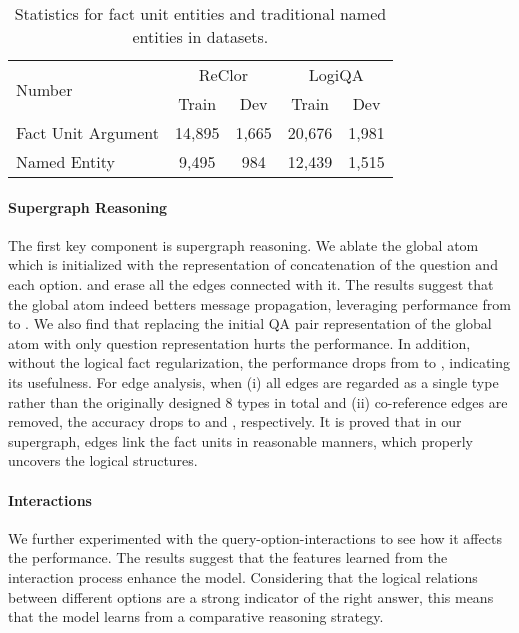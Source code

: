 \documentclass[11pt]{article}
\begin{document}
\begin{table}
\vspace{-3mm}
\setlength{\belowcaptionskip}{2pt}
\small
\centering\centering\setlength{\tabcolsep}{5.6pt}
\begin{tabular}{lcccc}
\toprule
\multirow{2}{*}{Number} &
\multicolumn{2}{c}{ReClor} & \multicolumn{2}{c}{LogiQA} \\
\cmidrule{2-5}
& Train & Dev & Train & Dev  \\ 
\midrule
Fact Unit Argument&14,895& 1,665 &20,676  & 1,981 \\
Named Entity &9,495& 984  & 12,439 & 1,515 \\
\bottomrule
\end{tabular}
\caption{Statistics for fact unit entities and traditional named entities in datasets.}\label{tabel: num_fact_units}
\vspace{-3mm}
\end{table}


\paragraph{Supergraph Reasoning} The first key component is supergraph reasoning. We ablate the global atom which is initialized with the representation of concatenation of the question and each option. and erase all the edges connected with it. The results suggest that the global atom indeed betters message propagation, leveraging performance from  to . We also find that replacing the initial QA pair representation of the global atom with only question representation hurts the performance. In addition, without the logical fact regularization, the performance drops from  to , indicating its usefulness. For edge analysis, when (i) all edges are regarded as a single type rather than the originally designed 8 types in total and (ii) co-reference edges are removed, the accuracy drops to  and , respectively. It is proved that in our supergraph, edges link the fact units in reasonable manners, which properly uncovers the logical structures.

\paragraph{Interactions}

We further experimented with the query-option-interactions to see how it affects the performance. The results suggest that the features learned from the interaction process enhance the model. Considering that the logical relations between different options are a strong indicator of the right answer, this means that the model learns from a comparative reasoning strategy.
\end{document}
